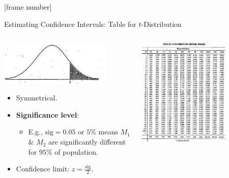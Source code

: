 \documentclass[aspectratio=169,t,table]{beamer}
\begin{document}
  {
    [frame number]
    \begin{frame}{Estimating Confidence Intervals: Table for $t$-Distribution}
      \begin{columns}
        \begin{column}{0.5\textwidth}
          \vspace{-6cm}
          \centering
          \includegraphics[width=0.8\textwidth]{img/ttest1.jpeg}
          \begin{itemize}
            \item Symmetrical.
            \item \textbf{\color{airforceblue}Significance level}:
            \begin{itemize}
              \item E.g., $\text{sig} = 0.05$ or $5\%$ means $M_1$ \& $M_2$ are significantly different for $95\%$ of population.
            \end{itemize}
            \item Confidence limit: $z = \frac{\text{sig}}{2}$.
          \end{itemize}
        \end{column}
        \begin{column}{0.5\textwidth}
          \centering
          \includegraphics[width=0.7\textwidth]{img/ttest2.jpeg}
        \end{column}
      \end{columns}
    \end{frame}
  }
\end{document}

